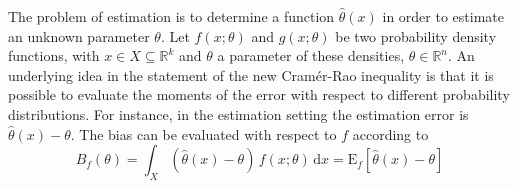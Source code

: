 \documentclass[english]{elsarticle}
\theoremstyle{definition}
\theoremstyle{plain}
\theoremstyle{plain}
\begin{document}
The problem of estimation is to determine a function $\hat{\theta}(x)$
in order to estimate an unknown parameter $\theta.$ Let $f(x;\theta)$
and $g(x;\theta)$ be two probability density functions, with $x\in X\subseteq\mathbb{R}^{k}$
and $\theta$ a parameter of these densities, $\theta\in\mathbb{R}^{n}$.
An underlying idea in the statement of the new Cramér-Rao inequality
is that it is possible to evaluate the moments of the error with respect
to different probability distributions. For instance, in the estimation
setting the estimation error is $\hat{\theta}(x)-\theta$. The bias
can be evaluated with respect to $f$ according to
\begin{equation}
B_{f}(\theta)=\int_{X}\left(\hat{\theta}(x)-\theta\right)\, f(x;\theta)\,\text{d}x=\mathrm{E}_{f}\left[\hat{\theta}(x)-\theta\right]\label{eq:DefinitionBiasVsf}
\end{equation}
\end{document}
